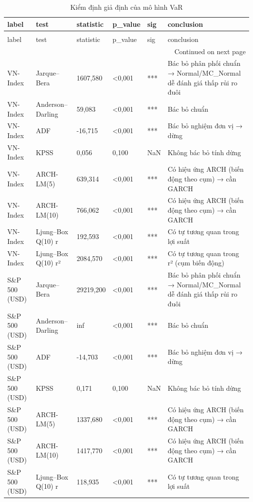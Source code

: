 \begin{longtable}{llllll}
\caption{Kiểm định giả định của mô hình VaR} \label{tab:T2_assumption_tests} \\
\toprule
label & test & statistic & p\_value & sig & conclusion \\
\midrule
\endfirsthead
\caption[]{Kiểm định giả định của mô hình VaR} \\
\toprule
label & test & statistic & p\_value & sig & conclusion \\
\midrule
\endhead
\midrule
\multicolumn{6}{r}{Continued on next page} \\
\midrule
\endfoot
\bottomrule
\endlastfoot
VN-Index & Jarque–Bera & 1607,580 & <0,001 & *** & Bác bỏ phân phối chuẩn → Normal/MC\_Normal dễ đánh giá thấp rủi ro đuôi \\
VN-Index & Anderson–Darling & 59,083 & <0,001 & *** & Bác bỏ chuẩn \\
VN-Index & ADF & -16,715 & <0,001 & *** & Bác bỏ nghiệm đơn vị → dừng \\
VN-Index & KPSS & 0,056 & 0,100 & NaN & Không bác bỏ tính dừng \\
VN-Index & ARCH-LM(5) & 639,314 & <0,001 & *** & Có hiệu ứng ARCH (biến động theo cụm) → cần GARCH \\
VN-Index & ARCH-LM(10) & 766,062 & <0,001 & *** & Có hiệu ứng ARCH (biến động theo cụm) → cần GARCH \\
VN-Index & Ljung–Box Q(10) r & 192,593 & <0,001 & *** & Có tự tương quan trong lợi suất \\
VN-Index & Ljung–Box Q(10) r² & 2084,570 & <0,001 & *** & Có tự tương quan trong r² (cụm biến động) \\
S\&P 500 (USD) & Jarque–Bera & 29219,200 & <0,001 & *** & Bác bỏ phân phối chuẩn → Normal/MC\_Normal dễ đánh giá thấp rủi ro đuôi \\
S\&P 500 (USD) & Anderson–Darling & inf & <0,001 & *** & Bác bỏ chuẩn \\
S\&P 500 (USD) & ADF & -14,703 & <0,001 & *** & Bác bỏ nghiệm đơn vị → dừng \\
S\&P 500 (USD) & KPSS & 0,171 & 0,100 & NaN & Không bác bỏ tính dừng \\
S\&P 500 (USD) & ARCH-LM(5) & 1337,680 & <0,001 & *** & Có hiệu ứng ARCH (biến động theo cụm) → cần GARCH \\
S\&P 500 (USD) & ARCH-LM(10) & 1417,770 & <0,001 & *** & Có hiệu ứng ARCH (biến động theo cụm) → cần GARCH \\
S\&P 500 (USD) & Ljung–Box Q(10) r & 118,935 & <0,001 & *** & Có tự tương quan trong lợi suất \\

\end{longtable}
